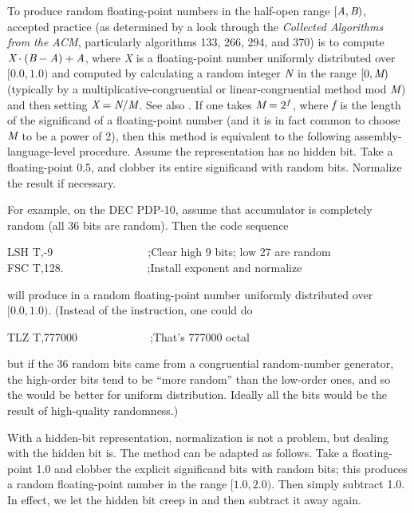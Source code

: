 \begin{defun}[Function]
\begin{implementation}
To produce random floating-point numbers in the half-open
range $[\emph{A},\emph{B})$,
accepted practice (as determined by a look through the
\emph{Collected Algorithms from the ACM}, particularly algorithms
133, 266, 294, and 370) is to compute $\emph{X}\cdot(\emph{B}-\emph{A})+\emph{A}$,
where \emph{X} is a floating-point number uniformly distributed over
$[0.0, 1.0)$
and computed by calculating a random integer $\emph{N}$ in the range
$[0,\emph{M})$
(typically by a multiplicative-congruential or linear-congruential method
mod $\emph{M}$) and then setting $\emph{X}=\emph{N}/\emph{M}$.  See also \cite{KNUTH-VOLUME-2}.
If one takes $\emph{M}=2^{f}$, where $\emph{f}$ is the length of the significand
of a floating-point number (and it is in fact common to choose $\emph{M}$
to be a power of 2), then this method is equivalent to the following
assembly-language-level procedure.  Assume the representation
has no hidden bit.  Take a floating-point 0.5,
and clobber its entire significand with random bits.  Normalize the
result if necessary.

For example, on the DEC PDP-10, assume that accumulator  is completely random
(all 36 bits are random).  Then the code sequence
\begin{lisp}
LSH T,-9~~~~~~~~~~~~~~~~~;\textrm{Clear high 9 bits; low 27 are random} \\
FSC T,128.~~~~~~~~~~~~~~~;\textrm{Install exponent and normalize}
\end{lisp}
will produce in  a random floating-point number uniformly distributed
over $[0.0, 1.0)$.  (Instead of the  instruction,
one could do
\begin{lisp}
TLZ T,777000~~~~~~~~~~~~~;\textrm{That's 777000 octal}
\end{lisp}
but if the 36 random bits came from a congruential random-number generator,
the high-order bits tend to be ``more random'' than the low-order ones,
and so the  would be better for uniform distribution.
Ideally all the bits would be the result of high-quality randomness.)

With a hidden-bit representation, normalization is not a problem,
but dealing with the hidden bit is.  The method can be adapted as follows.
Take a floating-point 1.0 and clobber the explicit significand bits with
random bits; this produces a random floating-point number in
the range $[1.0, 2.0)$.  Then simply subtract 1.0.  In effect, we
let the hidden bit creep in and then subtract it away again.


\end{implementation}
\end{defun}
